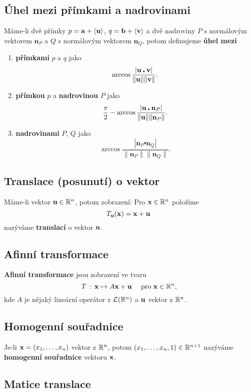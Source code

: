 \subsection*{Úhel mezi přímkami a nadrovinami}

Máme-li dvě přímky $p=\mathbf{a} + \langle \mathbf{u} \rangle$, $q=\mathbf{b}+\langle \mathbf{v} \rangle$ a dvě nadroviny $P$ s normálovým vektorem $\mathbf n_P$ a $Q$ s normálovým vektorem $\mathbf n_Q$, potom definujeme \textbf{úhel mezi}

\begin{enumerate}
	\item \textbf{přímkami} $p$ a $q$ jako
	\[ \arccos\frac{|\mathbf{u}\centerdot \mathbf{v}|}{\|\mathbf{u}\|\|\mathbf{v}\|}. \]
	\item  \textbf{přímkou} $p$ a \textbf{nadrovinou} $P$ jako
	\[ \frac{\pi}{2}-\arccos\frac{|\mathbf{u}\centerdot \mathbf n_P|}{\|\mathbf{u}\|\|\mathbf n_P\|}. \]
	\item \textbf{nadrovinami} $P$, $Q$ jako
	\[ \arccos\frac{|\mathbf n_P\centerdot \mathbf n_Q|}{\|\mathbf n_P\|\|\mathbf n_Q\|}. \]
\end{enumerate}

\subsection*{Translace (posunutí) o vektor}

Máme-li vektor $\mathbf{u}\in \mathbb{R}^n$, potom zobrazení: Pro $\mathbf{x}\in \mathbb{R}^n$ položíme
\[ T_{\mathbf{u}}(\mathbf{x})= \mathbf{x}+\mathbf{u}\, \]
nazýváme \textbf{translací} o vektor $\mathbf{u} $.

\subsection*{Afinní transformace}

\textbf{Afinní transformace} jsou zobrazení ve tvaru
\[T\,:\, \mathbf{x}\mapsto A\mathbf{x}+\mathbf{u} \quad \text{ pro } \mathbf{x}\in \mathbb{R}^n,\]
kde $A$ je nějaký lineární operátor z $\mathcal L(\mathbb{R}^n)$ a $\mathbf{u}$ vektor z $\mathbb{R}^n$.

\subsection*{Homogenní souřadnice}

Je-li $\mathbf{x}=(x_1,\dots,x_n)$ vektor z $\mathbb{R}^n$, potom $(x_1,\dots,x_n,1)\in \mathbb{R}^{n+1}$ nazýváme \textbf{homogenní souřadnice} vektoru $\mathbf{x}$.

\subsection*{Matice translace}

